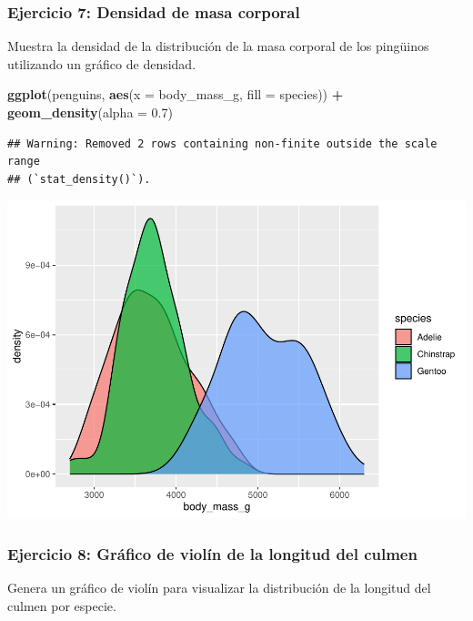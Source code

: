 \documentclass[
]{book}
\newenvironment{Shaded}{\begin{snugshade}}{\end{snugshade}}
\newcommand{\AttributeTok}[1]{\textcolor[rgb]{0.13,0.29,0.53}{#1}}
\newcommand{\FloatTok}[1]{\textcolor[rgb]{0.00,0.00,0.81}{#1}}
\newcommand{\FunctionTok}[1]{\textcolor[rgb]{0.13,0.29,0.53}{\textbf{#1}}}
\newcommand{\NormalTok}[1]{#1}
\newcommand{\SpecialCharTok}[1]{\textcolor[rgb]{0.81,0.36,0.00}{\textbf{#1}}}
\begin{document}
\subsubsection{Ejercicio 7: Densidad de masa corporal}\label{ejercicio-7-densidad-de-masa-corporal}

Muestra la densidad de la distribución de la masa corporal de los pingüinos utilizando un gráfico de densidad.

\begin{Shaded}
\begin{Highlighting}[]
\FunctionTok{ggplot}\NormalTok{(penguins, }\FunctionTok{aes}\NormalTok{(}\AttributeTok{x =}\NormalTok{ body\_mass\_g, }\AttributeTok{fill =}\NormalTok{ species)) }\SpecialCharTok{+}
  \FunctionTok{geom\_density}\NormalTok{(}\AttributeTok{alpha =} \FloatTok{0.7}\NormalTok{)}
\end{Highlighting}
\end{Shaded}

\begin{verbatim}
## Warning: Removed 2 rows containing non-finite outside the scale range
## (`stat_density()`).
\end{verbatim}

\includegraphics{bookdown-demo_files/figure-latex/unnamed-chunk-187-1.pdf}

\subsubsection{Ejercicio 8: Gráfico de violín de la longitud del culmen}\label{ejercicio-8-gruxe1fico-de-violuxedn-de-la-longitud-del-culmen}

Genera un gráfico de violín para visualizar la distribución de la longitud del culmen por especie.
\end{document}
